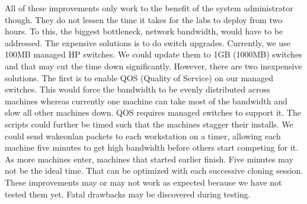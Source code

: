 All of these improvements only work to the benefit of the system administrator though.  They do not lessen the time it takes for the labs to deploy from two hours.  To this, the biggest bottleneck, network bandwidth, would have to be addressed.  The expensive solutions is to do switch upgrades.  Currently, we use 100MB managed HP switches.  We could update them to 1GB (1000MB) switches and that may cut the time down significantly.  However, there are two inexpensive solutions.  The first is to enable QOS (Quality of Service) on our managed switches.  This would force the bandwidth to be evenly distributed across machines whereas currently one machine can take most of the bandwidth and slow all other machines down.  QOS requires managed switches to support it.   The scripts could further be timed such that the machines stagger their installs.  We could send wakeonlan packets to each workstation on a timer, allowing each machine five minutes to get high bandwidth before others start competing for it.  As more machines enter, machines that started earlier finish.  Five minutes may not be the ideal time.  That can be optimized with each successive cloning session.  These improvements may or may not work as expected because we have not tested them yet.  Fatal drawbacks may be discovered during testing.  

